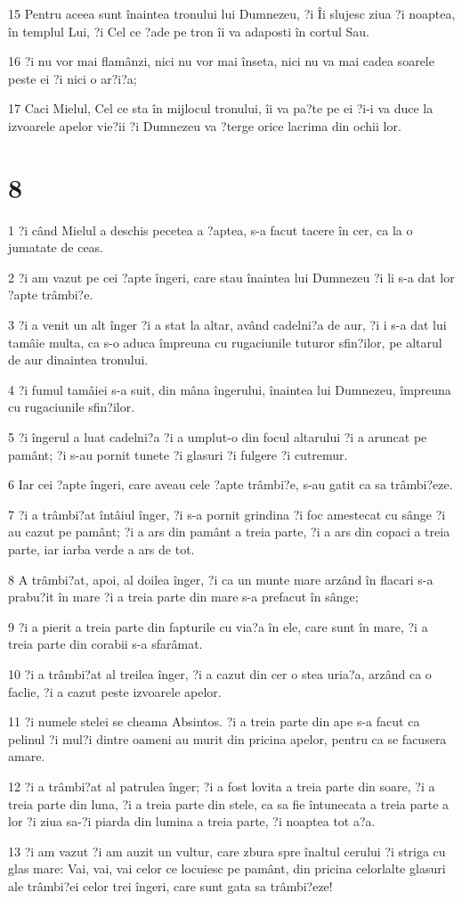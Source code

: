 \par 15 Pentru aceea sunt înaintea tronului lui Dumnezeu, ?i Îi slujesc ziua ?i noaptea, în templul Lui, ?i Cel ce ?ade pe tron îi va adaposti în cortul Sau.
\par 16 ?i nu vor mai flamânzi, nici nu vor mai înseta, nici nu va mai cadea soarele peste ei ?i nici o ar?i?a;
\par 17 Caci Mielul, Cel ce sta în mijlocul tronului, îi va pa?te pe ei ?i-i va duce la izvoarele apelor vie?ii ?i Dumnezeu va ?terge orice lacrima din ochii lor.

\chapter{8}

\par 1 ?i când Mielul a deschis pecetea a ?aptea, s-a facut tacere în cer, ca la o jumatate de ceas.
\par 2 ?i am vazut pe cei ?apte îngeri, care stau înaintea lui Dumnezeu ?i li s-a dat lor ?apte trâmbi?e.
\par 3 ?i a venit un alt înger ?i a stat la altar, având cadelni?a de aur, ?i i s-a dat lui tamâie multa, ca s-o aduca împreuna cu rugaciunile tuturor sfin?ilor, pe altarul de aur dinaintea tronului.
\par 4 ?i fumul tamâiei s-a suit, din mâna îngerului, înaintea lui Dumnezeu, împreuna cu rugaciunile sfin?ilor.
\par 5 ?i îngerul a luat cadelni?a ?i a umplut-o din focul altarului ?i a aruncat pe pamânt; ?i s-au pornit tunete ?i glasuri ?i fulgere ?i cutremur.
\par 6 Iar cei ?apte îngeri, care aveau cele ?apte trâmbi?e, s-au gatit ca sa trâmbi?eze.
\par 7 ?i a trâmbi?at întâiul înger, ?i s-a pornit grindina ?i foc amestecat cu sânge ?i au cazut pe pamânt; ?i a ars din pamânt a treia parte, ?i a ars din copaci a treia parte, iar iarba verde a ars de tot.
\par 8 A trâmbi?at, apoi, al doilea înger, ?i ca un munte mare arzând în flacari s-a prabu?it în mare ?i a treia parte din mare s-a prefacut în sânge;
\par 9 ?i a pierit a treia parte din fapturile cu via?a în ele, care sunt în mare, ?i a treia parte din corabii s-a sfarâmat.
\par 10 ?i a trâmbi?at al treilea înger, ?i a cazut din cer o stea uria?a, arzând ca o faclie, ?i a cazut peste izvoarele apelor.
\par 11 ?i numele stelei se cheama Absintos. ?i a treia parte din ape s-a facut ca pelinul ?i mul?i dintre oameni au murit din pricina apelor, pentru ca se facusera amare.
\par 12 ?i a trâmbi?at al patrulea înger; ?i a fost lovita a treia parte din soare, ?i a treia parte din luna, ?i a treia parte din stele, ca sa fie întunecata a treia parte a lor ?i ziua sa-?i piarda din lumina a treia parte, ?i noaptea tot a?a.
\par 13 ?i am vazut ?i am auzit un vultur, care zbura spre înaltul cerului ?i striga cu glas mare: Vai, vai, vai celor ce locuiesc pe pamânt, din pricina celorlalte glasuri ale trâmbi?ei celor trei îngeri, care sunt gata sa trâmbi?eze!

